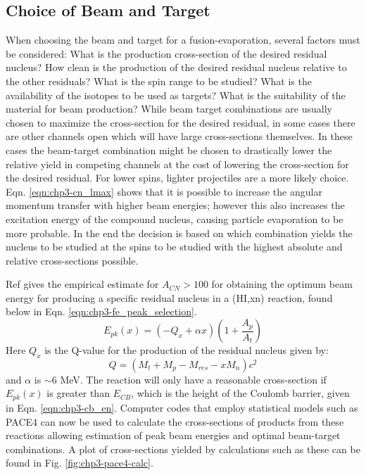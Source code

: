 \subsection{Choice of Beam and Target}
\label{ssec:exp-pr-fus-evap-beam-target}
When choosing the beam and target for a fusion-evaporation, several factors must be considered: What is the production cross-section of the desired residual nucleus? How clean is the production of the desired residual nucleus relative to the other residuals? What is the spin range to be studied? What is the availability of the isotopes to be used as targets? What is the suitability of the material for beam production? While beam target combinations are usually chosen to maximize the cross-section for the desired residual, in some cases there are other channels open which will have large cross-sections themselves. In these cases the beam-target combination might be chosen to drastically lower the relative yield in competing channels at the cost of lowering the cross-section for the desired residual. For lower spins, lighter projectiles are a more likely choice. Eqn. \ref{eqn:chp3-cn_lmax} shows that it is possible to increase the angular momentum transfer with higher beam energies; however this also increases the excitation energy of the compound nucleus, causing particle evaporation to be more probable. In the end the decision is based on which combination yields the nucleus to be studied at the spins to be studied with the highest absolute and relative cross-sections possible.

Ref \cite{nucSpecAndReacPartC} gives the empirical estimate for $A_{CN}>100$ for obtaining the optimum beam energy for producing a specific residual nucleus in a (HI,xn) reaction, found below in Eqn. \ref{eqn:chp3-fe_peak_selection}.
\begin{equation}
\label{eqn:chp3-fe_peak_selection}
E_{pk}(x)=(-Q_{x} + \alpha{}x)(1+\frac{A_p}{A_t})
\end{equation}
Here $Q_x$ is the Q-value for the production of the residual nucleus given by:
\begin{equation}
\label{eqn:chp3-res_qvalue}
Q = (M_t+M_p-M_{res}-x M_n)c^2
\end{equation}
and $\alpha$ is $\sim6$ MeV. The reaction will only have a reasonable cross-section if $E_{pk}(x)$ is greater than $E_{CB}$, which is the height of the Coulomb barrier, given in Eqn. \ref{eqn:chp3-cb_en}. Computer codes that employ statistical models such as PACE4\cite{PACE4,PACE4_2} can now be used to calculate the cross-sections of products from these reactions allowing estimation of peak beam energies and optimal beam-target combinations. A plot of cross-sections yielded by calculations such as these can be found in Fig. \ref{fig:chp3-pace4-calc}.

